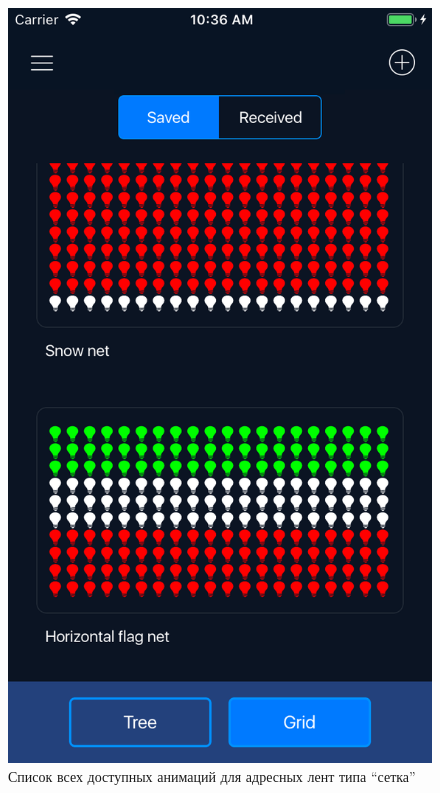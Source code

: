 ~
\begin{figure}[H]
\centering
	\includegraphics[scale=0.2]{figures/userGuide/mainGrid.png}
	\caption{Список всех доступных анимаций для адресных лент типа \enquote{сетка}}
	\label{fig:develop:userGuide:mainGrid}
\end{figure}
~
